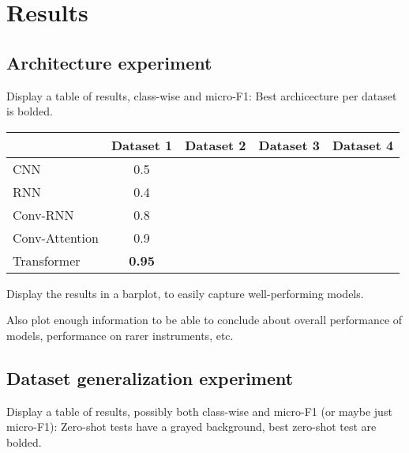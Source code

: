 \chapter{Results}

\section{Architecture experiment}

Display a table of results, class-wise and micro-F1:
Best archicecture per dataset is bolded.

\begin{center}
    \begin{tabular}{|l|cccc|}
    \hline
                   & Dataset 1 & Dataset 2 & Dataset 3 & Dataset 4 \\
    \hline
    CNN            & 0.5       &           &           &           \\
    RNN            & 0.4       &           &           &           \\
    Conv-RNN       & 0.8       &           &           &           \\
    Conv-Attention & 0.9       &           &           &           \\
    Transformer    & \textbf{0.95}      &           &           &           \\   
    \hline

    \end{tabular}
\end{center}

Display the results in a barplot, to easily capture well-performing models.

Also plot enough information to be able to conclude about overall performance of models, performance on rarer instruments, etc.


\section{Dataset generalization experiment}

Display a table of results, possibly both class-wise and micro-F1 (or maybe just micro-F1):
Zero-shot tests have a grayed background, best zero-shot test are bolded.

